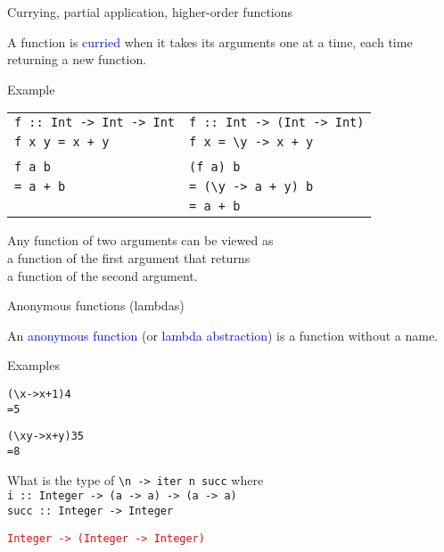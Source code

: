 \documentclass{beamer}
\def\code#1{\texttt{\frenchspacing#1}}
\begin{document}
\begin{frame}{Currying, partial application, higher-order functions}

A function is \textcolor{blue}{curried} when it takes its arguments one at a time, each time returning a new function.

\pause

\begin{exampleblock}{Example}
\vspace{0.25cm}
\begin{tabular}{ll}
    \code{f :: Int -> Int -> Int} & \code{f :: Int -> (Int -> Int)} \\
    \code{f x y = x + y} & \code{f x = \textbackslash y -> x + y}\pause \\
    & \\
    \code{f a b} & \code{(f a) b}\pause \\
    \code{= a + b}\pause & \code{= (\textbackslash y -> a + y) b}\pause \\
    & \code{= a + b}
\end{tabular}
\end{exampleblock}

\pause

\begin{block}{\centering Any function of two arguments can be viewed as \\ a function of the first argument that returns \\ a function of the second argument.}
\end{block}

\end{frame}

\begin{frame}[fragile]{Anonymous functions (lambdas)}

An \textcolor{blue}{anonymous function} (or \textcolor{blue}{lambda abstraction}) is a function without a name.

\pause

\begin{exampleblock}{Examples}
\begin{alltt}
({\textbackslash}x -> x + 1) 4\pause
= 5

({\textbackslash}x y -> x + y) 3 5\pause
= 8
\end{alltt}
\end{exampleblock}

\pause

What is the type of \code{\textbackslash n -> iter n succ} where \\
\code{i :: Integer -> (a -> a) -> (a -> a)} \\
\code{succ :: Integer -> Integer}

\pause

\vspace{0.25cm}
\textcolor{red}{\code{Integer -> (Integer -> Integer)}}

\end{frame}
\end{document}
